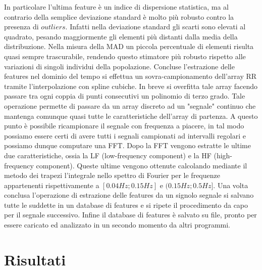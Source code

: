 \documentclass[a4paper, 12pt]{book}
\begin{document}
In particolare l'ultima feature è un indice di dispersione statistica, ma al contrario della semplice deviazione standard è molto più robusto contro la presenza di $outliers$.
Infatti nella deviazione standard gli scarti sono elevati al quadrato, pesando maggiormente gli elementi più distanti dalla media della distribuzione.
Nella misura della MAD un piccola percentuale di elementi risulta quasi sempre trascurabile, rendendo questo stimatore più robusto rispetto alle variazioni di singoli individui della popolazione.
Concluse l'estrazione delle features nel dominio del tempo si effettua un sovra-campionamento dell'array RR tramite l'interpolazione con spline cubiche.
In breve si overfitta tale array facendo passare tra ogni coppia di punti consecutivi un polinomio di terzo grado.
Tale operazione permette di passare da un array discreto ad un "segnale" continuo che mantenga comunque quasi tutte le caratteristiche dell'array di partenza.
A questo punto è possibile ricampionare il segnale con frequenza a piacere, in tal modo possiamo essere certi di avere tutti i segnali campionati ad intervalli regolari e possiamo dunque computare una FFT.
Dopo la FFT vengono estratte le ultime due caratteristiche, ossia la LF (low-frequency component) e la HF (high-frequency component).
Queste ultime vengono ottenute calcolando mediante il metodo dei trapezi l'integrale nello spettro di Fourier per le frequenze appartenenti rispettivamente a $[0.04Hz;0.15Hz]$ e $(0.15Hz;0.5Hz]$.
Una volta conclusa l'operazione di estrazione delle features da un signolo segnale si salvano tutte le suddette in un database di features e si ripete il procedimento da capo per il segnale successivo.
Infine il database di features è salvato su file, pronto per essere caricato ed analizzato in un secondo momento da altri programmi.





\chapter{Risultati}
\end{document}

